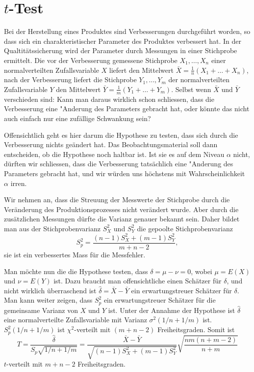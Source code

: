 \section{\texorpdfstring{$t$}{t}-Test} \label{section-t-test}
Bei der Herstellung eines Produktes sind Verbesserungen durchgeführt worden,
so dass sich ein charakteristischer Parameter des Produktes verbessert hat.
In der Qualtitätssicherung wird der Parameter durch Messungen in einer
Stichprobe ermittelt.
Die vor der Verbesserung gemessene Stichprobe
$X_1,\dots,X_n$
einer normalverteilten Zufallsvariable $X$ liefert den Mittelwert
$\bar X=\frac1n(X_1+\dots+X_n)$, nach
der Verbesserung liefert die Stichprobe $Y_1,\dots,Y_m$ der normalverteilten
Zufallsvariable $Y$ den Mittelwert
$\bar Y=\frac1m(Y_1+\dots+Y_m)$.
Selbst wenn $\bar X$ und $\bar Y$
verschieden sind: Kann man daraus wirklich schon schliessen, dass die
Verbesserung eine "Anderung des Parameters gebracht hat, oder könnte
das nicht auch einfach nur eine zufällige Schwankung sein?

Offensichtlich geht es hier darum die Hypothese zu testen, dass sich
durch die Verbesserung nichts geändert hat.
Das Beobachtungsmaterial
soll dann entscheiden, ob die Hypothese noch haltbar ist.
Ist sie es
auf dem Niveau $\alpha$ nicht,
dürften wir schliessen, dass die Verbesserung tatsächlich eine "Anderung
des Parameters gebracht hat, und wir würden uns höchstens mit 
Wahrscheinlichkeit $\alpha$ irren.

Wir nehmen an, dass die Streuung der Messwerte der Stichprobe durch die
Veränderung des Produktionsprozesses nicht verändert wurde.
Aber durch
die zusätzlichen Messungen dürfte die Varianz genauer bekannt sein.
Daher bildet man aus der Stichprobenvarianz $S_X^2$ und $S_Y^2$
die gepoolte Stichprobenvarianz
\begin{equation}
S_p^2=\frac{(n-1)S_X^2+(m-1)S_Y^2}{m+n-2},
\label{pooled-variance}
\end{equation}
sie ist ein verbessertes Mass für die Messfehler.

Man möchte nun die die Hypothese testen, dass $\delta=\mu-\nu=0$, wobei
$\mu=E(X)$ und $\nu=E(Y)$ ist.
Dazu braucht man offensichtliche einen
Schätzer für $\delta$, und nicht wirklich überraschend ist
$\hat\delta=\bar X-\bar Y$ ein erwartungstreuer Schätzer für $\delta$.
Man kann weiter zeigen, dass $S_p^2$ ein erwartungstreuer Schätzer
für die gemeinsame Varianz von $X$ und $Y$ ist.
Unter der Annahme der
Hypothese ist $\hat\delta$ eine normalverteilte Zufallsvariable
mit Varianz $\sigma^2(1/n+1/m)$ ist.
$S_p^2(1/n+1/m)$ ist $\chi^2$-verteilt
mit $(m+n-2)$ Freiheitsgraden.
Somit ist 
\begin{equation}
T=\frac{\hat\delta}{S_p\sqrt{1/n+1/m}}
=\frac{\bar X-\bar Y}{\sqrt{(n-1)S_X^2+(m-1)S_Y^2}}\sqrt{\frac{nm(n+m-2)}{n+m}}
\label{t-test-ausdruck}
\end{equation}
$t$-verteilt mit $m+n-2$ Freiheitsgraden.

